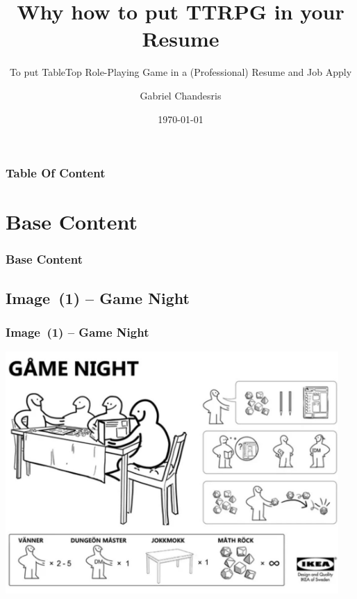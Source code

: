 \documentclass[slidetop,11pt]{beamer}
\title{Why how to put TTRPG in your Resume}
\subtitle{To put TableTop Role-Playing Game \newline in a (Professional) Resume and Job Apply}
\author{Gabriel Chandesris}
\date{\today} %
\begin{document}
\frame[plain]{\titlepage}
%


\begin{frame}
	\frametitle{Table Of Content}
	\small \tableofcontents[hideallsubsections]
\end{frame} 

\def\sectionItitle{Base Content}
\section{ \sectionItitle }
\begin{frame}
	\frametitle{ \sectionItitle }
	\tableofcontents[sections=1,currentsection,subsectionstyle=show/shaded/hide]
\end{frame} 

\def\subsectionTtitle{Image}

\subsection{ \subsectionTtitle~(1)  -- Game Night }
\begin{frame}
	\frametitle{ \subsectionTtitle~(1) -- Game Night }
	\includegraphics[width=0.95\textwidth]{132926019-440f4a99-81b7-45ea-8c4a-92993496556c.jpg} 
\end{frame} 
\end{document}
